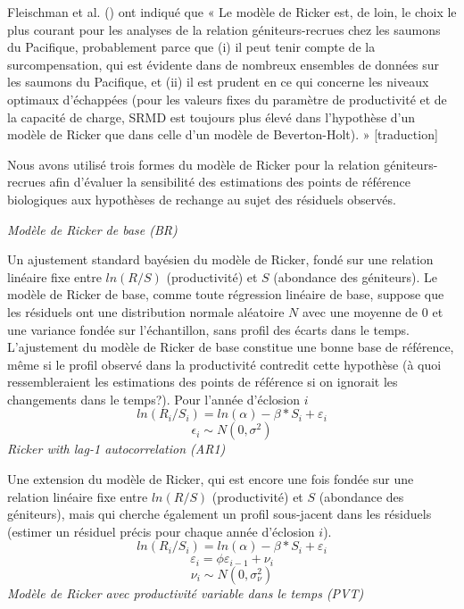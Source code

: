 \documentclass[french,11pt]{book}
\begin{document}
Fleischman et al. () ont indiqué que « Le modèle de Ricker est, de loin, le choix le plus courant pour les analyses de la relation géniteurs-recrues chez les saumons du Pacifique, probablement parce que (i) il peut tenir compte de la surcompensation, qui est évidente dans de nombreux ensembles de données sur les saumons du Pacifique, et (ii) il est prudent en ce qui concerne les niveaux optimaux d'échappées (pour les valeurs fixes du paramètre de productivité et de la capacité de charge, SRMD est toujours plus élevé dans l'hypothèse d'un modèle de Ricker que dans celle d'un modèle de Beverton-Holt). » {[}traduction{]}

Nous avons utilisé trois formes du modèle de Ricker pour la relation géniteurs-recrues afin d'évaluer la sensibilité des estimations des points de référence biologiques aux hypothèses de rechange au sujet des résiduels observés.

\emph{Modèle de Ricker de base (BR)}

Un ajustement standard bayésien du modèle de Ricker, fondé sur une relation linéaire fixe entre \(ln(R/S)\) (productivité) et \(S\) (abondance des géniteurs). Le modèle de Ricker de base, comme toute régression linéaire de base, suppose que les résiduels ont une distribution normale aléatoire \(N\) avec une moyenne de 0 et une variance fondée sur l'échantillon, sans profil des écarts dans le temps. L'ajustement du modèle de Ricker de base constitue une bonne base de référence, même si le profil observé dans la productivité contredit cette hypothèse (à quoi ressembleraient les estimations des points de référence si on ignorait les changements dans le temps?). Pour l'année d'éclosion \(i\)
\begin{equation} 
  ln(R_{i}/S_{i}) = ln(\alpha) - \beta * S_{i} + \varepsilon_{i}
  \label{eq:BasicRicker}
\end{equation}
\begin{equation} 
  \epsilon_i \sim N(0,\sigma^2)
  \label{eq:BasicRickerResid}
\end{equation}
\emph{Ricker with lag-1 autocorrelation (AR1)}

Une extension du modèle de Ricker, qui est encore une fois fondée sur une relation linéaire fixe entre \(ln(R/S)\) (productivité) et \(S\) (abondance des géniteurs), mais qui cherche également un profil sous-jacent dans les résiduels (estimer un résiduel précis pour chaque année d'éclosion \(i\)).
\begin{equation} 
  ln(R_{i}/S_{i}) = ln(\alpha) - \beta * S_{i} + \varepsilon_{i}
  \label{eq:AR1Ricker}
\end{equation}
\begin{equation} 
  \varepsilon_i = \phi \varepsilon_{i-1} + \nu_i
  \label{eq:AR1RickerResid1}
\end{equation}
\begin{equation} 
  \nu_i \sim N(0,\sigma_{\nu}^2)
  \label{eq:AR1RickerResid2}
\end{equation}
\emph{Modèle de Ricker avec productivité variable dans le temps (PVT)}
\end{document}
